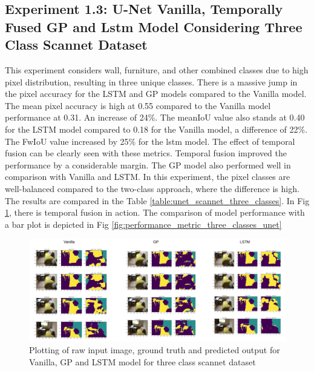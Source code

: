     \subsection{Experiment 1.3: U-Net Vanilla, Temporally Fused GP and Lstm Model Considering Three Class Scannet Dataset}
	
	This experiment considers wall, furniture, and other combined classes due to high pixel distribution, resulting in three unique classes. There is a massive jump in the pixel accuracy for the LSTM and GP models compared to the Vanilla model. The mean pixel accuracy is high at 0.55 compared to the Vanilla model performance at 0.31. An increase of 24\%. The meanIoU value also stands at 0.40 for the LSTM model compared to 0.18 for the Vanilla model, a difference of 22\%. The FwIoU value increased by 25\% for the lstm model. The effect of temporal fusion can be clearly seen with these metrics. Temporal fusion improved the performance by a considerable margin. The GP model also performed well in comparison with Vanilla and LSTM. In this experiment, the pixel classes are well-balanced compared to the two-class approach, where the difference is high. The results are compared in the Table \ref{table:unet_scannet_three_classes}. In Fig \ref{fig:performance_metric_three_classes_scannet}, there is temporal fusion in action. The comparison of model performance with a bar plot is depicted in Fig \ref{fig:performance_metric_three_classes_unet}
	
	\begin{figure}
		\centering
		\includegraphics[width=16cm]{images/unet_scannet_three_classes.png}
		\caption{Plotting of raw input image, ground truth and predicted output for Vanilla, GP and LSTM model for three class scannet dataset}
		\label{fig:performance_metric_three_classes_scannet}
	\end{figure}

